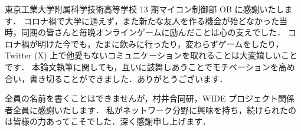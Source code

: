 東京工業大学附属科学技術高等学校 13 期マイコン制御部 OB に感謝いたします．
コロナ禍で大学に通えず，また新たな友人を作る機会が殆どなかった当時，同期の皆さんと毎晩オンラインゲームに励んだことは心の支えでした．
コロナ禍が明けた今でも，たまに飲みに行ったり，変わらずゲームをしたり，Twitter (X) 上で他愛もないコミュニケーションを取れることは大変嬉しいことです．
本論文執筆に関しても，互いに鼓舞しあうことでモチベーションを高め合い，書き切ることができました．ありがとうございます．

全員の名前を書くことはできませんが，村井合同研，WIDE プロジェクト関係者全員に感謝いたします．
私がネットワーク分野に興味を持ち，続けられたのは皆様の力あってこそでした．深く感謝申し上げます．